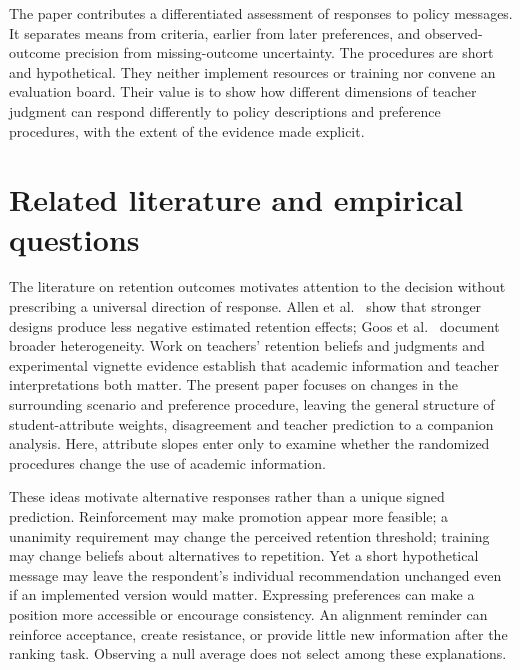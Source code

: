 The paper contributes a differentiated assessment of responses to policy messages. It separates means from criteria, earlier from later preferences, and observed-outcome precision from missing-outcome uncertainty. The procedures are short and hypothetical. They neither implement resources or training nor convene an evaluation board. Their value is to show how different dimensions of teacher judgment can respond differently to policy descriptions and preference procedures, with the extent of the evidence made explicit.

\section{Related literature and empirical questions}
The literature on retention outcomes motivates attention to the decision without prescribing a universal direction of response. Allen et al.\ \cite{allen} show that stronger designs produce less negative estimated retention effects; Goos et al.\ \cite{goos} document broader heterogeneity. Work on teachers' retention beliefs and judgments \cite{tomchin,bonvin} and experimental vignette evidence \cite{klapproth} establish that academic information and teacher interpretations both matter. The present paper focuses on changes in the surrounding scenario and preference procedure, leaving the general structure of student-attribute weights, disagreement and teacher prediction to a companion analysis. Here, attribute slopes enter only to examine whether the randomized procedures change the use of academic information.

\cite{kunda,pajares,spillane}

These ideas motivate alternative responses rather than a unique signed prediction. Reinforcement may make promotion appear more feasible; a unanimity requirement may change the perceived retention threshold; training may change beliefs about alternatives to repetition. Yet a short hypothetical message may leave the respondent's individual recommendation unchanged even if an implemented version would matter. Expressing preferences can make a position more accessible or encourage consistency. An alignment reminder can reinforce acceptance, create resistance, or provide little new information after the ranking task. Observing a null average does not select among these explanations.

